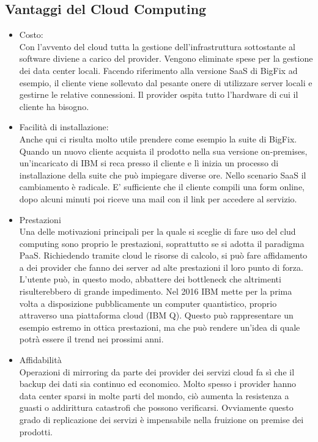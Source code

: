 \subsection{Vantaggi del Cloud Computing}
\begin{itemize}
	\item Costo: \\
	Con l'avvento del cloud tutta la gestione dell'infrastruttura sottostante al software diviene a carico del provider. Vengono eliminate spese per la gestione dei data center locali. Facendo riferimento alla versione SaaS di BigFix ad esempio, il cliente viene sollevato dal pesante onere di utilizzare server locali e gestirne le relative connessioni. Il provider ospita tutto l'hardware di cui il cliente ha bisogno.
	
	\item Facilità di installazione: \\
	Anche qui ci risulta molto utile prendere come esempio la suite di BigFix. Quando un nuovo cliente acquista il prodotto nella sua versione on-premises, un'incaricato di IBM si reca presso il cliente e lì inizia un processo di installazione della suite che può impiegare diverse ore. Nello scenario SaaS il cambiamento è radicale. E' sufficiente che il cliente compili una form online, dopo alcuni minuti poi riceve una mail con il link per accedere al servizio.
	
	\item Prestazioni \\
	Una delle motivazioni principali per la quale si sceglie di fare uso del clud computing sono proprio le prestazioni, soprattutto se si adotta il paradigma PaaS. Richiedendo tramite cloud le risorse di calcolo, si può fare affidamento a dei provider che fanno dei server ad alte prestazioni il loro punto di forza. L'utente può, in questo modo, abbattere dei bottleneck che altrimenti risulterebbero di grande impedimento. Nel 2016 IBM mette per la prima volta a disposizione pubblicamente un computer quantistico, proprio attraverso una piattaforma cloud (IBM Q). Questo può rappresentare un esempio estremo in ottica prestazioni, ma che può rendere un'idea di quale potrà essere il trend nei prossimi anni.
	
	\item Affidabilità \\
	Operazioni di mirroring da parte dei provider dei servizi cloud fa sì che il backup dei dati sia continuo ed economico. Molto spesso i provider hanno data center sparsi in molte parti del mondo, ciò aumenta la resistenza a guasti o addirittura catastrofi che possono verificarsi. Ovviamente questo grado di replicazione dei servizi è impensabile nella fruizione on premise dei prodotti.
\end{itemize}

